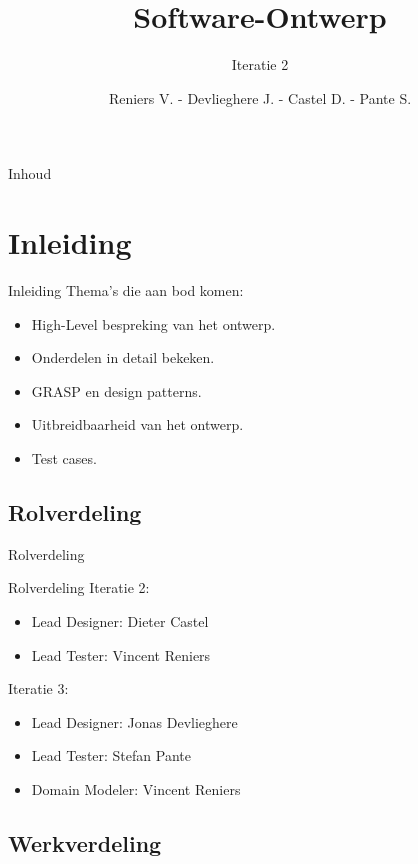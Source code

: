 \documentclass[t]{beamer}
\title{Software-Ontwerp}
\subtitle{Iteratie 2}
\author{Reniers V. - Devlieghere J. - Castel D. - Pante S.}
\institute{KU Leuven}
\begin{document}
\frame{\titlepage} 
\begin{frame}{Inhoud}
\begin{multicols}{2}
\tableofcontents
\end{multicols}
\end{frame}



\section{Inleiding} 
\begin{frame}{Inleiding} 
Thema's die aan bod komen:
\begin{itemize}
	\item High-Level bespreking van het ontwerp.
	\item Onderdelen in detail bekeken.
	\item GRASP en design patterns.
	\item Uitbreidbaarheid van het ontwerp.
	\item Test cases.
\end{itemize}
\end{frame}

\subsection{Rolverdeling}
\begin{frame}{Rolverdeling}
\begin{multicols}{2}
\tableofcontents[currentsection]
\end{multicols}
\end{frame}

\begin{frame}{Rolverdeling}
Iteratie 2:
\begin{itemize}
	\item Lead Designer: Dieter Castel
	\item Lead Tester: Vincent Reniers
\end{itemize}

Iteratie 3:
\begin{itemize}
	\item Lead Designer: Jonas Devlieghere
	\item Lead Tester: Stefan Pante
	\item Domain Modeler: Vincent Reniers
\end{itemize}
\end{frame}

\subsection{Werkverdeling}
\end{document}
